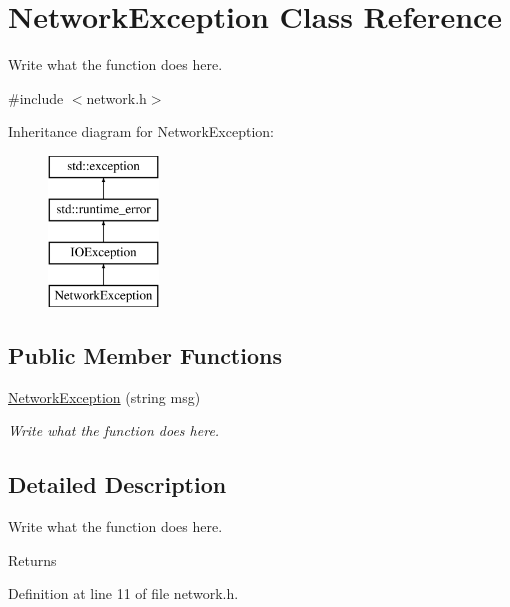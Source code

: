 \hypertarget{classNetworkException}{\section{Network\+Exception Class Reference}
\label{classNetworkException}
}


Write what the function does here.  




{\ttfamily \#include $<$network.\+h$>$}

Inheritance diagram for Network\+Exception\+:\begin{figure}[H]
\begin{center}
\leavevmode
\includegraphics[height=4.000000cm]{classNetworkException}
\end{center}
\end{figure}
\subsection*{Public Member Functions}
\begin{DoxyCompactItemize}
\item 
\hyperlink{classNetworkException_a7b2fde9c75da04d6a3d9e5bb332594ac}{Network\+Exception} (string msg)
\begin{DoxyCompactList}\small\item\em Write what the function does here. \end{DoxyCompactList}\end{DoxyCompactItemize}


\subsection{Detailed Description}
Write what the function does here. 

\begin{DoxyReturn}{Returns}

\end{DoxyReturn}


Definition at line 11 of file network.\+h.



